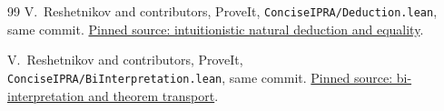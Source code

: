\begin{thebibliography}{99}
V.~Reshetnikov and contributors, ProveIt,
\texttt{ConciseIPRA/Deduction.lean}, same commit.
\href{https://github.com/VladimirReshetnikov/ProveIt/blob/b33ee1acb02b7619dfef419e61c3e343735a7bc4/Logic/PrimitiveRecursiveArithmetic/ConciseIPRA/Lean/ConciseIPRA/Deduction.lean}{Pinned source: intuitionistic natural deduction and equality}.

V.~Reshetnikov and contributors, ProveIt,
\texttt{ConciseIPRA/BiInterpretation.lean}, same commit.
\href{https://github.com/VladimirReshetnikov/ProveIt/blob/b33ee1acb02b7619dfef419e61c3e343735a7bc4/Logic/PrimitiveRecursiveArithmetic/ConciseIPRA/Lean/ConciseIPRA/BiInterpretation.lean}{Pinned source: bi-interpretation and theorem transport}.

\end{thebibliography}
